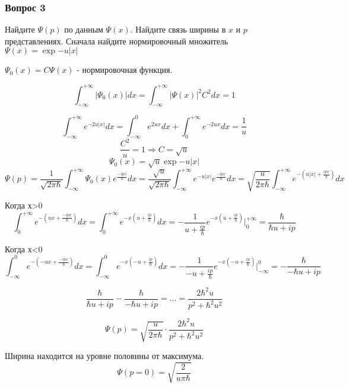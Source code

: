 \subsubsection{Вопрос 3}

 Найдите $\Psi(p)$ по данным $\Psi(x)$. Найдите связь ширины в $x$ и $p$ представлениях. Сначала найдите нормировочный множитель $\Psi(x)=\exp{-u|x|}$


$\Psi_0(x)=C\Psi(x)$ - нормировочная функция.

$$\int_{-\infty}^{+\infty}|\Psi_0(x)|dx = \int_{-\infty}^{+\infty}|\Psi(x)|^2C^2dx=1$$

$$\int_{-\infty}^{+\infty} e^{-2u|x|}dx=\int_{-\infty}^{0} e^{2ux}dx+\int_{0}^{+\infty} e^{-2ux}dx=\frac{1}{u}$$
$$\frac{C^2}{u}=1 \Longrightarrow C=\sqrt{u}$$
$$\Psi_0(x)=\sqrt{u}\exp{-u|x|}$$
$$\Psi(p)=\frac{1}{\sqrt{2\pi \hbar}}\int_{-\infty}^{+\infty} \Psi_0(x) e^{\frac{-ipx}{\hbar}}dx=\frac{\sqrt{u}}{\sqrt{2\pi \hbar}}\int_{-\infty}^{+\infty} e^{-u|x|} e^{\frac{-ipx}{\hbar}}dx=\sqrt{\frac{u}{2\pi \hbar}}\int_{-\infty}^{+\infty} e^{-(u|x|+\frac{ipx}{\hbar})}dx$$

Когда х>0
$$\int_{0}^{+\infty} e^{-(ux+\frac{-ipx}{\hbar})}dx=\int_{0}^{+\infty} e^{-x(u+\frac{ip}{\hbar})}dx=-\frac{1}{u+\frac{ip}{\hbar}}e^{-x(u+\frac{ip}{\hbar})} \bigg|_0^{+\infty}=\frac{\hbar}{\hbar u+ip}$$

Когда х<0
$$\int_{-\infty}^{0} e^{-(-ux+\frac{-ipx}{\hbar})}dx=\int_{-\infty}^{0} e^{-x(-u+\frac{ip}{\hbar})}dx=-\frac{1}{-u+\frac{ip}{\hbar}}e^{-x(-u+\frac{ip}{\hbar})} \bigg|_{-\infty}^0=-\frac{\hbar}{-\hbar u+ip}$$

$$\frac{\hbar}{\hbar u+ip}-\frac{\hbar}{-\hbar u+ip}=...=\frac{2\hbar ^2u}{p^2+\hbar ^2u^2}$$


$$\Psi(p)=\sqrt{\frac{u}{2\pi \hbar}} \cdot \frac{2\hbar ^2u}{p^2+\hbar ^2u^2}$$


 Ширина находится на уровне половины от максимума.
 $$\Psi(p=0)=\sqrt{\frac{2}{u\pi \hbar}}$$

